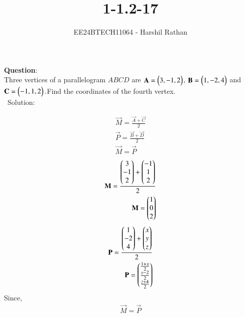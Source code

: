 \documentclass[journal]{IEEEtran}
\begin{document}

\vspace{3cm}

\title{1-1.2-17}
\author{EE24BTECH11064 - Harshil Rathan }
{\let\newpage\relax\maketitle}

\renewcommand{\thefigure}{\theenumi}
\renewcommand{\thetable}{\theenumi}
\setlength{\intextsep}{10pt} %


\renewcommand{\thetable}{\theenumi}
\textbf{Question}:\\
Three vertices of a parallelogram $ABCD$ are $\mathbf{A}=\begin{pmatrix}3,-1,2\end{pmatrix}$, $\mathbf{B}=\begin{pmatrix}1,-2,4\end{pmatrix}$ and $\mathbf{C}=\begin{pmatrix}-1,1,2\end{pmatrix}.$Find the coordinates of the fourth vertex.
\\
\ {Solution: }
\begin{table}[h!]    
  \centering
  
\end{table}
\begin{align}
    \vec{M} = \frac{\vec{A}+\vec{C}}{2}\\
    \vec{P} = \frac{\vec{B}+\vec{D}}{2}\\
    \vec{M} = \vec{P}
\end{align}    
\begin{align}    
\mathbf{M}=\frac{\begin{pmatrix}3\\-1\\2\end{pmatrix}+\begin{pmatrix}-1\\1\\2\end{pmatrix}}{2}\\
\mathbf{M} =\begin{pmatrix}1\\0\\2\end{pmatrix}
\end{align}
\begin{align}
\mathbf{P}=\frac{\begin{pmatrix}1\\-2\\4\end{pmatrix}+\begin{pmatrix}x\\y\\z\end{pmatrix}}{2}\\
\mathbf{P}=\begin{pmatrix}\frac{1+x}{2}\\ \frac{y-2}{2} \\ \frac{z+4}{2}\end{pmatrix}
\end{align}
Since,
\begin{align}
\vec{M} = \vec{P}
\end{align}
\end{document}
